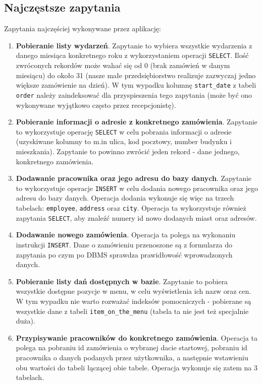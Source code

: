 \documentclass[12pt]{article}
\newcommand{\doinsert}{\texttt{INSERT}}
\begin{document}
\subsection{Najczęstsze zapytania}

\noindent Zapytania najczęściej wykonywane przez aplikację:
\begin{enumerate}
    \item \textbf{Pobieranie listy wydarzeń}. Zapytanie to wybiera wszystkie wydarzenia z danego miesiąca konkretnego roku z wykorzystaniem operacji \texttt{SELECT}. Ilość zwróconych rekordów może wahać się od 0 (brak zamówień w danym miesiącu) do około 31 (nasze małe przedsiębiorstwo realizuje zazwyczaj jedno większe zamówienie na dzień). W tym wypadku kolumnę \texttt{start\_date} z tabeli \texttt{order} należy zaindeksować dla przyspieszenia tego zapytania (może być ono wykonywane wyjątkowo często przez recepcjonistę).
    
    \item \textbf{Pobieranie informacji o adresie z konkretnego zamówienia}. Zapytanie to wykorzystuje operację \texttt{SELECT} w celu pobrania informacji o adresie (uzyskiwane kolumny to m.in ulica, kod pocztowy, number budynku i mieszkania). Zapytanie to powinno zwrócić jeden rekord - dane jednego, konkretnego zamówienia.
    
    \item \textbf{Dodawanie pracownika oraz jego adresu do bazy danych}. Zapytanie to wykorzystuje operacje \texttt{INSERT} w celu dodania nowego pracownika oraz jego adresu do bazy danych. Operacja dodania wykonuje się więc na trzech tabelach: \texttt{employee}, \texttt{address} oraz \texttt{city}. Operacja ta wykorzystuje również zapytania \texttt{SELECT}, aby znaleźć numery id nowo dodanych miast oraz adresów.
    
    \item \textbf{Dodawanie nowego zamówienia}. Operacja ta polega na wykonaniu instrukcji \doinsert. Dane o zamówieniu przenoszone są z formularza do zapytania po czym po DBMS sprawdza prawidłowość wprowadzonych danych.
    
    \item \textbf{Pobieranie listy dań dostępnych w bazie}. Zapytanie to pobiera wszystkie dostępne pozycje w menu, w celu wyświetlenia ich nazw oraz cen. W tym wypadku nie warto rozważać indeksów pomocniczych - pobierane są wszystkie dane z tabeli \texttt{item\_on\_the\_menu} (tabela ta nie jest też specjalnie duża).
    
    \item \textbf{Przypisywanie pracowników do konkretnego zamówienia}. Operacja ta polega na pobraniu id zamówienia o wybranej dacie startowej, pobraniu id pracownika o danych podanych przez użytkownika, a następnie wstawieniu obu wartości do tabeli łączącej obie tabele. Operacja wykonuje się zatem na 3 tabelach.
    
\end{enumerate}
\end{document}
